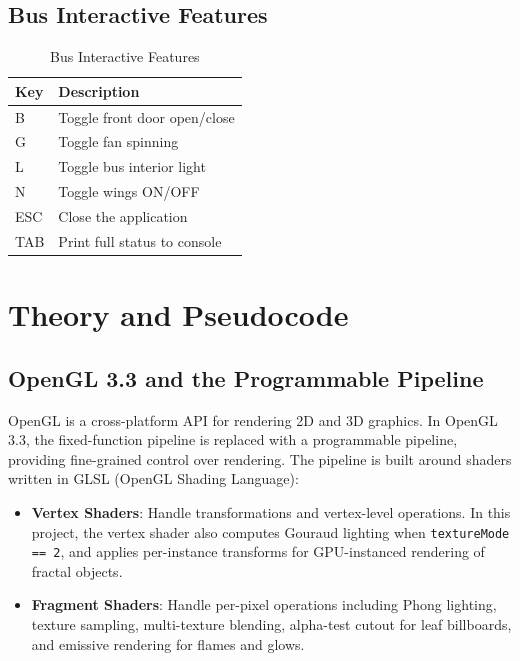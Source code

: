 \documentclass[12pt,a4paper]{article}
\begin{document}
\subsection{Bus Interactive Features}

\begin{table}[H]
\centering
\begin{tabular}{ll}
\toprule
\textbf{Key} & \textbf{Description} \\
\midrule
B & Toggle front door open/close \\
G & Toggle fan spinning \\
L & Toggle bus interior light \\
N & Toggle wings ON/OFF \\
ESC & Close the application \\
TAB & Print full status to console \\
\bottomrule
\end{tabular}
\caption{Bus Interactive Features}
\end{table}

\section{Theory and Pseudocode}

\subsection{OpenGL 3.3 and the Programmable Pipeline}

OpenGL is a cross-platform API for rendering 2D and 3D graphics. In OpenGL 3.3, the fixed-function pipeline is replaced with a programmable pipeline, providing fine-grained control over rendering. The pipeline is built around shaders written in GLSL (OpenGL Shading Language):

\begin{itemize}
    \item \textbf{Vertex Shaders}: Handle transformations and vertex-level operations. In this project, the vertex shader also computes Gouraud lighting when \texttt{textureMode == 2}, and applies per-instance transforms for GPU-instanced rendering of fractal objects.
    \item \textbf{Fragment Shaders}: Handle per-pixel operations including Phong lighting, texture sampling, multi-texture blending, alpha-test cutout for leaf billboards, and emissive rendering for flames and glows.
\end{itemize}
\end{document}
